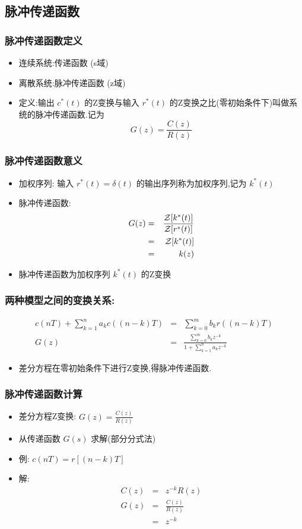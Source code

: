 \documentclass[table]{beamer}
\begin{document}
\subsection{脉冲传递函数}
\label{sec-4-2}
\begin{frame}
\frametitle{脉冲传递函数定义}
\label{sec-4-2-1}

\begin{itemize}
\item 连续系统:传递函数 (s域)
\item 离散系统:脉冲传递函数 (z域)
\item <2->定义:输出  $c^*(t)$   的Z变换与输入  $r^*(t)$  的Z变换之比(零初始条件下)叫做系统的脉冲传递函数.记为 
	 \[G(z)=\frac{C(z)}{R(z)}\]
\end{itemize}
\end{frame}
\begin{frame}
\frametitle{脉冲传递函数意义}
\label{sec-4-2-2}

\begin{itemize}
\item 加权序列: 输入  $r^*(t)=\delta(t)$  的输出序列称为加权序列,记为  $k^*(t)$
\item <2->脉冲传递函数: 
      \begin{eqnarray*}
      G(z) &=& \frac{{\cal Z}[k^*(t)]}{{\cal Z}[r^*(t)]} \\
      &=& {\cal Z}[k^*(t)]\\
      &=& k(z)
      \end{eqnarray*}
\item <3-> 脉冲传递函数为加权序列  $k^*(t)$  的Z变换
\end{itemize}
\end{frame}
\begin{frame}
\frametitle{两种模型之间的变换关系:}
\label{sec-4-2-3}

      \begin{eqnarray*}
      c(nT)+\sum_{k=1}^n a_k c((n-k)T) &=& \sum_{k=0}^m b_k r((n-k)T) \\
      G(z) &=& \frac{\sum_{k=0}^{m}b_k z^{-k}}{1+\sum_{k=1}^n a_k z^{-k}}
      \end{eqnarray*}
\begin{itemize}
\item <2-> 差分方程在零初始条件下进行Z变换,得脉冲传递函数.
\end{itemize}
\end{frame}
\begin{frame}
\frametitle{脉冲传递函数计算}
\label{sec-4-2-4}

\begin{itemize}
\item 差分方程Z变换:  $G(z)=\frac{C(z)}{R(z)}$
\item 从传递函数  $G(s)$  求解(部分分式法)
\item <2->例:  $c(nT)=r[(n-k)T]$
\item <3->解:
       \begin{eqnarray*}
       C(z) &=& z^{-k}R(z) \\
       G(z) &=& \frac{C(z)}{R(z)} \\
         &=& z^{-k}
       \end{eqnarray*}
\end{itemize}
\end{frame}
\end{document}
